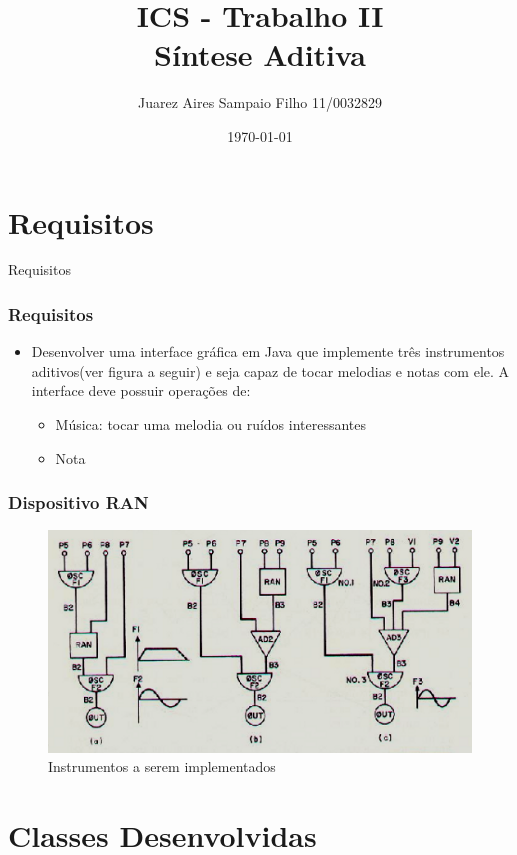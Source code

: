 \documentclass{beamer}
\title[Introdução a Computação Sônica]{ ICS - Trabalho II \\ Síntese Aditiva}
\author{Juarez Aires Sampaio Filho 11/0032829}
\institute{Universidade de Brasília}
\date{\today}
\begin{document}
\begin{frame}
        \titlepage
\end{frame}

\section{Requisitos}
\begin{frame}{Requisitos}
	\frametitle{Requisitos}
    \begin{itemize}
	\item Desenvolver uma interface gráfica em Java que implemente três instrumentos aditivos(ver figura a seguir) 
	e seja capaz de tocar melodias e notas com ele. A interface deve possuir operações de:
	\begin{itemize}
	 \item Música: tocar uma melodia ou ruídos interessantes
	 \item Nota
	 \end{itemize}
    \end{itemize}
\end{frame}

\begin{frame}
 \frametitle{Dispositivo RAN}
 \begin{figure}
  \includegraphics[scale=0.6]{./images/meusInstrumentos.png}
  \caption{Instrumentos a serem implementados}
   \end{figure}
\end{frame}

\section{Classes Desenvolvidas}
\end{document}
